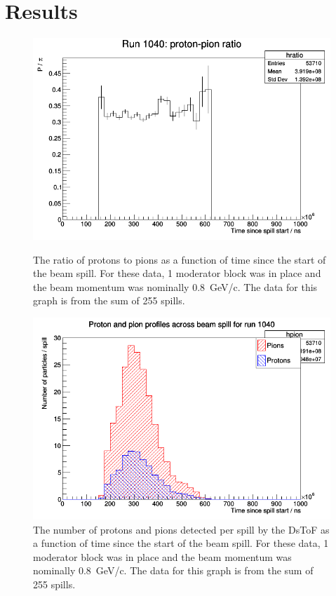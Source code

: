 \section{Results}
\label{hptpcPaper:sec:Results}

	\begin{figure}[ht]
		\begin{minipage}[t]{0.48\textwidth}
			\centering
			\includegraphics[width=\textwidth]{files/Figures/Run1040_proPiRatio}
			\caption{The ratio of protons to pions as a function of time since the start of the beam spill. For these data, 1 moderator block was in place and the beam momentum was nominally 0.8~GeV/c. The data for this graph is from the sum of 255 spills.}
			\label{fig:proPiRatio}
		\end{minipage} 
		\hspace{0.3cm}
		\begin{minipage}[t]{0.48\textwidth}
			\centering
			\includegraphics[width=\textwidth]{files/Figures/Run1040_proPiProf}
			\caption{The number of protons and pions detected per spill by the DsToF as a function of time since the start of the beam spill. For these data, 1 moderator block was in place and the beam momentum was nominally 0.8~GeV/c. The data for this graph is from the sum of 255 spills.}
			\label{fig:proPiProf}
		\end{minipage}
	\end{figure}

